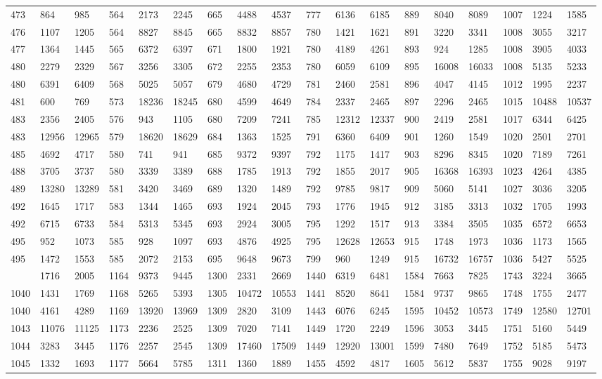 \begin{center}
\begin{longtable}{*5{A@{\hspace*{5mm}}A}}
473&864&985&564&2173&2245&665&4488&4537&777&6136&6185&889&8040&8089&1007&1224&1585\\
476&1107&1205&564&8827&8845&665&8832&8857&780&1421&1621&891&3220&3341&1008&3055&3217\\
477&1364&1445&565&6372&6397&671&1800&1921&780&4189&4261&893&924&1285&1008&3905&4033\\
480&2279&2329&567&3256&3305&672&2255&2353&780&6059&6109&895&16008&16033&1008&5135&5233\\
480&6391&6409&568&5025&5057&679&4680&4729&781&2460&2581&896&4047&4145&1012&1995&2237\\
481&600&769&573&18236&18245&680&4599&4649&784&2337&2465&897&2296&2465&1015&10488&10537\\
483&2356&2405&576&943&1105&680&7209&7241&785&12312&12337&900&2419&2581&1017&6344&6425\\
483&12956&12965&579&18620&18629&684&1363&1525&791&6360&6409&901&1260&1549&1020&2501&2701\\
485&4692&4717&580&741&941&685&9372&9397&792&1175&1417&903&8296&8345&1020&7189&7261\\
488&3705&3737&580&3339&3389&688&1785&1913&792&1855&2017&905&16368&16393&1023&4264&4385\\
489&13280&13289&581&3420&3469&689&1320&1489&792&9785&9817&909&5060&5141&1027&3036&3205\\
492&1645&1717&583&1344&1465&693&1924&2045&793&1776&1945&912&3185&3313&1032&1705&1993\\
492&6715&6733&584&5313&5345&693&2924&3005&795&1292&1517&913&3384&3505&1035&6572&6653\\
495&952&1073&585&928&1097&693&4876&4925&795&12628&12653&915&1748&1973&1036&1173&1565\\
495&1472&1553&585&2072&2153&695&9648&9673&799&960&1249&915&16732&16757&1036&5427&5525\\
&1716&2005&1164&9373&9445&1300&2331&2669&1440&6319&6481&1584&7663&7825&1743&3224&3665\\
1040&1431&1769&1168&5265&5393&1305&10472&10553&1441&8520&8641&1584&9737&9865&1748&1755&2477\\
1040&4161&4289&1169&13920&13969&1309&2820&3109&1443&6076&6245&1595&10452&10573&1749&12580&12701\\
1043&11076&11125&1173&2236&2525&1309&7020&7141&1449&1720&2249&1596&3053&3445&1751&5160&5449\\
1044&3283&3445&1176&2257&2545&1309&17460&17509&1449&12920&13001&1599&7480&7649&1752&5185&5473\\
1045&1332&1693&1177&5664&5785&1311&1360&1889&1455&4592&4817&1605&5612&5837&1755&9028&9197\\

\end{longtable}
\end{center}
